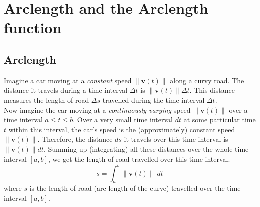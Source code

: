 \documentclass[12pt,letterpaper,fleqn]{article}
\renewcommand{\vec}[1]{\ensuremath{\pmb{#1}}}
\begin{document}
\section*{Arclength and the Arclength function}
\subsection*{Arclength}
Imagine a car moving at a \emph{constant} speed $\|\vec{v}(t)\|$ along a curvy road. The distance it travels during a time interval $\Delta t$ is $\|\vec{v}(t)\|\Delta t$. This distance measures the length of road $\Delta s$ travelled during the time interval $\Delta t$.\\[1.5ex] Now imagine the car moving at a \emph{continuously varying} speed $\|\vec{v}(t)\|$ over a time interval $a \leq t \leq b$. Over a very small time interval $dt$ at some particular time $t$ within this interval, the car's speed is the (approximately) constant speed $\|\vec{v}(t)\|$. Therefore, the distance $ds$ it travels over this time interval is $\|\vec{v}(t)\| dt$. Summing up (integrating) all these distances over the whole time interval $[a, b]$, we get the length of road travelled over this time interval.
  \begin{equation*}
    s = \int_a^b \|\vec{v}(t)\|\;dt
  \end{equation*}
  where $s$ is the length of road (arc-length of the curve) travelled over the time interval $[a, b]$.
\end{document}
